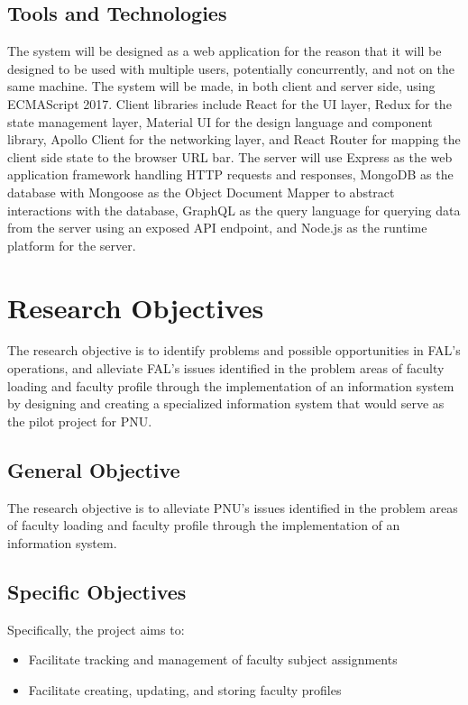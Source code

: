 \subsection{Tools and Technologies}
The system will be designed as a web application for the reason that it will be designed to be used with multiple users, potentially concurrently, and not on the same machine. The system will be made, in both client and server side, using ECMAScript 2017. Client libraries include React for the UI layer, Redux for the state management layer, Material UI for the design language and component library, Apollo Client for the networking layer, and React Router for mapping the client side state to the browser URL bar. The server will use Express as the web application framework handling HTTP requests and responses, MongoDB as the database with Mongoose as the Object Document Mapper to abstract interactions with the database, GraphQL as the query language for querying data from the server using an exposed API endpoint, and Node.js as the runtime platform for the server.

\section{Research Objectives}
The research objective is to identify problems and possible opportunities in FAL's operations, and alleviate FAL's issues identified in the problem areas of faculty loading and faculty profile through the implementation of an information system by designing and creating a specialized information system that would serve as the pilot project for PNU.

\subsection{General Objective}
The research objective is to alleviate PNU's issues identified in the problem areas of faculty loading and faculty profile through the implementation of an information system.

\subsection{Specific Objectives}
Specifically, the project aims to:
\begin{itemize}
\item Facilitate tracking and management of faculty subject assignments
\item Facilitate creating, updating, and storing faculty profiles
\end{itemize}

